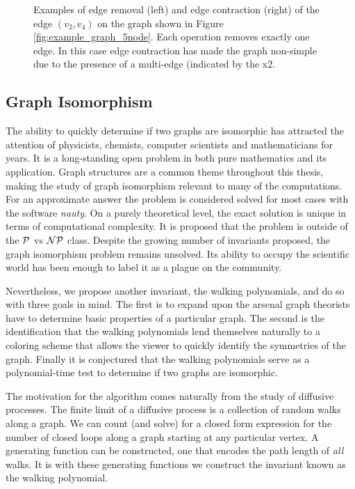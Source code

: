 \begin{figure}[ht]
\begin{center}
  \end{center}
  \caption{Examples of edge removal (left) and edge contraction (right) of the edge $(v_2, v_4)$ on the graph shown in Figure \ref{fig:example_graph_5node}. Each operation removes exactly one edge. In this case edge contraction has made the graph non-simple due to the presence of a multi-edge (indicated by the x2.}
  \label{fig:example_graph_5node_operations}
\end{figure}

\subsection{Graph Isomorphism}
The ability to quickly determine if two graphs are isomorphic has attracted the attention of physicists, chemists, computer scientists and mathematicians for years. It is a long-standing open problem in both pure mathematics and its application. Graph structures are a common theme throughout this thesis, making the study of graph isomorphism relevant to many of the computations. For an approximate answer the problem is considered solved for most cases with the software \textit{nauty}.\cite{mckay_nauty} On a purely theoretical level, the exact solution is unique in terms of computational complexity. It is proposed that the problem is outside of the $\cal{P}$ vs $\cal{NP}$ class.\cite{schoning_graph_1988} Despite the growing number of invariants proposed, the graph isomorphism problem remains unsolved. Its ability to occupy the scientific world has been enough to label it as a plague on the community.\cite{read_graph_1977}

Nevertheless, we propose another invariant, the walking polynomials,  and do so with three goals in mind. The first is to expand upon the arsenal graph theorists have to determine basic properties of a particular graph. The second is the identification that the walking polynomials lend themselves naturally to a coloring scheme that allows the viewer to quickly identify the symmetries of the graph. Finally it is conjectured that the walking polynomials serve as a polynomial-time test to determine if two graphs are isomorphic.

The motivation for the algorithm comes naturally from the study of diffusive processes. The finite limit of a diffusive process is a collection of random walks along a graph. We can count (and solve) for a closed form expression for the number of closed loops along a graph starting at any particular vertex. A generating function can be constructed, one that encodes the path length of \textit{all} walks. It is with these generating functions we construct the invariant known as the walking polynomial.

